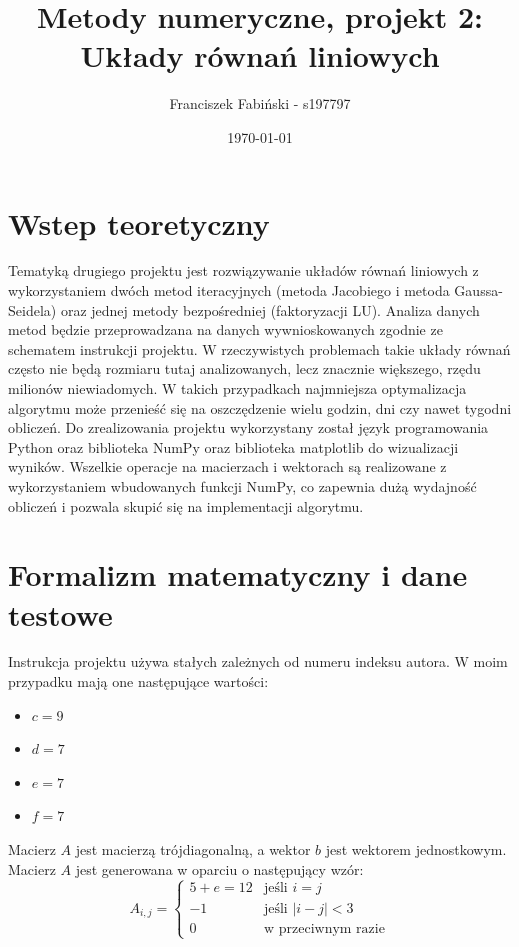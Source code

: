 \documentclass[a4paper,12pt]{article}  %
\title{Metody numeryczne, projekt 2:\\ Układy równań liniowych}
\author{Franciszek Fabiński - s197797}
\date{\today}
\begin{document}
\maketitle  %

\section{Wstep teoretyczny}

Tematyką drugiego projektu jest rozwiązywanie układów równań liniowych
z wykorzystaniem dwóch metod iteracyjnych (metoda Jacobiego i metoda Gaussa-Seidela) oraz
jednej metody bezpośredniej (faktoryzacji LU). Analiza danych metod będzie
przeprowadzana na danych wywnioskowanych zgodnie ze schematem instrukcji
projektu. 
\smallbreak
W rzeczywistych problemach takie układy równań często nie będą rozmiaru tutaj
analizowanych, lecz znacznie większego, rzędu milionów niewiadomych. W takich
przypadkach najmniejsza optymalizacja algorytmu może przenieść się na
oszczędzenie wielu godzin, dni czy nawet tygodni obliczeń.
\smallbreak
Do zrealizowania projektu wykorzystany został język programowania Python oraz
biblioteka NumPy oraz biblioteka matplotlib do wizualizacji wyników. Wszelkie
operacje na macierzach i wektorach są realizowane z wykorzystaniem
wbudowanych funkcji NumPy, co zapewnia dużą wydajność obliczeń i pozwala skupić
się na implementacji algorytmu.

\pagebreak
\section{Formalizm matematyczny i dane testowe}
Instrukcja projektu używa stałych zależnych od numeru indeksu autora. W
moim przypadku mają one następujące wartości:

\begin{itemize}
  \item $c = 9$
  \item $d = 7$
  \item $e = 7$
  \item $f = 7$
\end{itemize}

Macierz $A$ jest macierzą trójdiagonalną, a wektor $b$ jest wektorem
jednostkowym. Macierz $A$ jest generowana w oparciu o następujący wzór:
\begin{equation}
    A_{i,j} = \begin{cases}
        5+e = 12 & \text{jeśli } i = j \\
        -1 & \text{jeśli } |i - j| < 3 \\
        0 & \text{w przeciwnym razie}
    \end{cases}
\end{equation}
\end{document}
